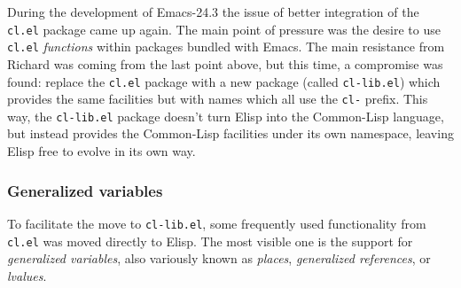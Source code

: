 \documentclass[format=acmsmall, review=false, screen=true]{acmart}
\newcommand \Elisp {Elisp}
\begin{document}

During the development of Emacs-24.3 the issue of better integration of the
\texttt{cl.el} package came up again.  The main point of pressure was the
desire to use \texttt{cl.el} \emph{functions} within packages bundled with
Emacs.  The main resistance from Richard was coming from the last point
above, but this time, a compromise was found: replace
the \texttt{cl.el} package with a new package (called \texttt{cl-lib.el})
which provides the same facilities but with names which all use the
\texttt{cl-} prefix.  This way, the \texttt{cl-lib.el} package doesn't turn
\Elisp{} into the Common-Lisp language, but instead provides the Common-Lisp
facilities under its own namespace, leaving \Elisp{} free to evolve in its
own way.


\subsubsection{Generalized variables} %

To facilitate the move to \texttt{cl-lib.el}, some frequently used
functionality from \texttt{cl.el} was moved directly to \Elisp{}.  The most
visible one is the support for \emph{generalized variables}, also variously
known as \emph{places}, \emph{generalized references}, or \emph{lvalues}.
\end{document}
